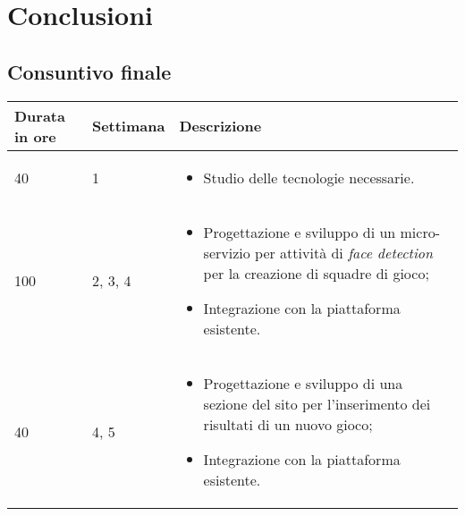 
\chapter{Conclusioni}
\label{cap:conclusioni}

\section{Consuntivo finale}

\begin{center}
	
	\renewcommand{\arraystretch}{1.5}
	
	\centering
	\begin{longtable}{| C{2.5cm} | C{2cm} | L{7.2cm} |}
		
		\hline
		
		\textbf{Durata in ore} & \textbf{Settimana} & \textbf{Descrizione} \\
		
		\hline
		
		40 & 1 &
		\begin{itemize}[leftmargin=*]
			\item Studio delle tecnologie necessarie.
		\end{itemize} \\
		
		\hline
		
		100 & 2, 3, 4 &
		\begin{itemize}[leftmargin=*]
			\item Progettazione e sviluppo di un micro-servizio per attività di \emph{face detection} per 
			la creazione di squadre di gioco;
			\item Integrazione con la piattaforma esistente. 
		\end{itemize}  \\
		
		\hline
		
		40 & 4, 5 &
		\begin{itemize}[leftmargin=*]
			\item Progettazione e sviluppo di una sezione del sito per l'inserimento dei risultati di un nuovo gioco;
			\item Integrazione con la piattaforma esistente. 
		\end{itemize}  \\
		

\end{longtable}
\end{center}
